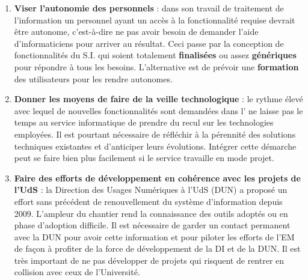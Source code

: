 \documentclass{book}
\begin{document}
\begin{enumerate}
\item \textbf{Viser l'autonomie des personnels} : dans son travail de traitement de
l'information un personnel ayant un accès à la fonctionnalité requise devrait être 
autonome, c'est-à-dire ne pas avoir besoin de demander l'aide d'informaticiens 
pour arriver au résultat. Ceci passe par la conception de fonctionnalités du S.I. qui
soient totalement \textbf{finalisées} ou assez \textbf{génériques} pour répondre à tous 
les besoins. L'alternative est de prévoir une \textbf{formation} des utilisateurs pour
les rendre autonomes.


\item \textbf{Donner les moyens de faire de la veille technologique} : le rythme
élevé avec lequel de nouvelles fonctionnalités sont demandées dans l'
ne laisse pas le temps au service informatique de prendre du recul sur les technologies
employées. Il est pourtant nécessaire de réfléchir à la pérennité des solutions techniques
existantes et d'anticiper leurs évolutions. Intégrer cette démarche peut se faire
bien plus facilement si le service travaille en mode projet.\\


\item \textbf{Faire des efforts de développement en cohérence avec les projets de l'UdS} : 
la Direction des Usages Numériques à l'UdS (DUN) a proposé un effort sans précédent de renouvellement
du système d'information depuis 2009. L'ampleur du chantier rend la connaissance des
outils adoptés ou en phase d'adoption difficile. Il est nécessaire de garder un contact
permanent avec la DUN pour avoir cette information et pour piloter les efforts de 
l'EM de façon à profiter de la force de développement de la DI et de la DUN.
Il est très important de ne pas développer de projets qui risquent de rentrer en 
collision avec ceux de l'Université. 


\end{enumerate}


%	





\appendix
\end{document}
